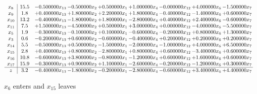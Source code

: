 \documentclass[10pt]{article}
\begin{document}
 \[\begin{array}{c| c c@{\hskip 2pt} c@{\hskip 2pt} c@{\hskip 2pt} c@{\hskip 2pt} c@{\hskip 2pt} c@{\hskip 2pt} c@{\hskip 2pt} }
 x_{8}   &  15.5 & -0.500000 x_{13} & -0.500000 x_{2} & + 0.500000 x_{1} & + 1.000000 x_{4} & -0.000000 x_{12} & + 4.000000 x_{6} & -1.500000 x_{7}\\
 x_{9}   &  1.8 & + 0.400000 x_{13} & + 1.800000 x_{2} & + 2.200000 x_{1} & + 1.800000 x_{4} & -0.400000 x_{12} & -1.400000 x_{6} & + 0.600000 x_{7}\\
 x_{10}   &  13.2 & -0.400000 x_{13} & -1.800000 x_{2} & + 1.800000 x_{1} & -2.800000 x_{4} & + 0.400000 x_{12} & + 2.400000 x_{6} & -0.600000 x_{7}\\
 x_{11}   &  7.5 & + 1.500000 x_{13} & -4.500000 x_{2} & + 0.500000 x_{1} & + 3.000000 x_{4} & + 0.000000 x_{12} & -4.000000 x_{6} & -5.500000 x_{7}\\
 x_{5}   &  1.9 & -0.300000 x_{13} & -0.100000 x_{2} & + 0.100000 x_{1} & -0.600000 x_{4} & -0.200000 x_{12} & + 0.800000 x_{6} & + 1.300000 x_{7}\\
 x_{3}   &  0.6 & -0.200000 x_{13} & + 0.600000 x_{2} & -0.600000 x_{1} & -0.400000 x_{4} & + 0.200000 x_{12} & + 0.200000 x_{6} & + 0.200000 x_{7}\\
 x_{14}   &  5.5 & -0.500000 x_{13} & + 0.500000 x_{2} & -1.500000 x_{1} & -2.000000 x_{4} & -1.000000 x_{12} & + 4.000000 x_{6} & + 6.500000 x_{7}\\
 x_{15}   &  2.8 & + 0.400000 x_{13} & + 0.800000 x_{2} & -2.800000 x_{1} & + 0.800000 x_{4} & + 0.600000 x_{12} & -3.400000 x_{6} & + 0.600000 x_{7}\\
 x_{16}   &  10.8 & -0.600000 x_{13} & + 3.800000 x_{2} & -0.800000 x_{1} & -1.200000 x_{4} & + 0.600000 x_{12} & + 1.600000 x_{6} & + 0.600000 x_{7}\\
 x_{17}   &  15.9 & -0.300000 x_{13} & + 0.900000 x_{2} & + 1.100000 x_{1} & -2.600000 x_{4} & -0.200000 x_{12} & -1.200000 x_{6} & + 0.300000 x_{7}\\
\hline
z    &  3.2 & -0.400000 x_{13} & -1.800000 x_{2} & -0.200000 x_{1} & -2.800000 x_{4} & -0.600000 x_{12} & + 3.400000 x_{6} & + 4.400000 x_{7}\\
\end{array}\]


 $ x_{6} $ enters and $ x_{15} $ leaves 
\end{document}
